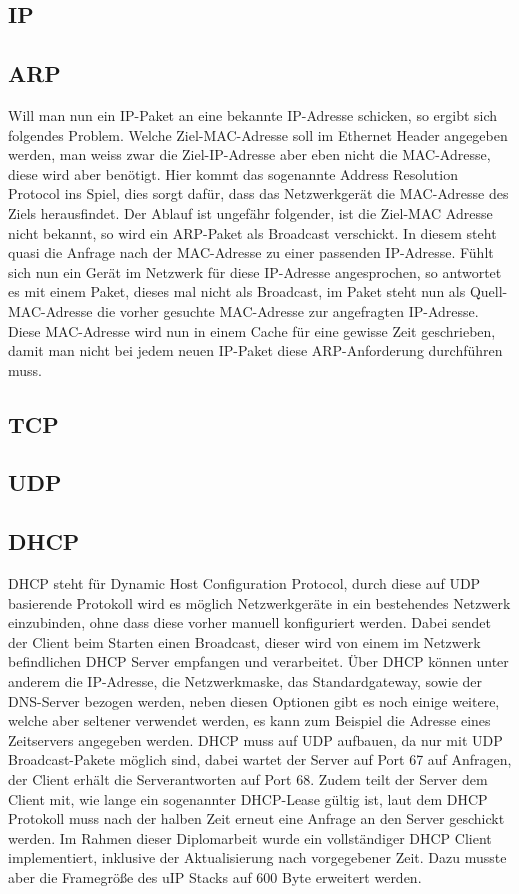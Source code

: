 \documentclass[a4paper,14pt,headsepline]{scrartcl}
\begin{document}
\subsection{IP}

\subsection{ARP}
Will man nun ein IP-Paket an eine bekannte IP-Adresse schicken, so ergibt sich folgendes Problem. Welche Ziel-MAC-Adresse soll im Ethernet Header angegeben werden, man weiss zwar die Ziel-IP-Adresse aber eben nicht die MAC-Adresse, diese wird aber benötigt. Hier kommt das sogenannte Address Resolution Protocol ins Spiel, dies sorgt dafür, dass das Netzwerkgerät die MAC-Adresse des Ziels herausfindet. Der Ablauf ist ungefähr folgender, ist die Ziel-MAC Adresse nicht bekannt, so wird ein ARP-Paket als Broadcast verschickt. In diesem steht quasi die Anfrage nach der MAC-Adresse zu einer passenden IP-Adresse. Fühlt sich nun ein Gerät im Netzwerk für diese IP-Adresse angesprochen, so antwortet es mit einem Paket, dieses mal nicht als Broadcast, im Paket steht nun als Quell-MAC-Adresse die vorher gesuchte MAC-Adresse zur angefragten IP-Adresse. Diese MAC-Adresse wird nun in einem Cache für eine gewisse Zeit geschrieben, damit man nicht bei jedem neuen IP-Paket diese ARP-Anforderung durchführen muss.

\subsection{TCP}

\subsection{UDP}

\subsection{DHCP}
DHCP steht für Dynamic Host Configuration Protocol, durch diese auf UDP basierende Protokoll wird es möglich Netzwerkgeräte in ein bestehendes Netzwerk einzubinden, ohne dass diese vorher manuell konfiguriert werden. Dabei sendet der Client beim Starten einen Broadcast, dieser wird von einem im Netzwerk befindlichen DHCP Server empfangen und verarbeitet. Über DHCP können unter anderem die IP-Adresse, die Netzwerkmaske, das Standardgateway, sowie der DNS-Server bezogen werden, neben diesen Optionen gibt es noch einige weitere, welche aber seltener verwendet werden, es kann zum Beispiel die Adresse eines Zeitservers angegeben werden. DHCP muss auf UDP aufbauen, da nur mit UDP Broadcast-Pakete möglich sind, dabei wartet der Server auf Port 67 auf Anfragen, der Client erhält die Serverantworten auf Port 68. Zudem teilt der Server dem Client mit, wie lange ein sogenannter DHCP-Lease gültig ist, laut dem DHCP Protokoll muss nach der halben Zeit erneut eine Anfrage an den Server geschickt werden. Im Rahmen dieser Diplomarbeit wurde ein vollständiger DHCP Client implementiert, inklusive der Aktualisierung nach vorgegebener Zeit. Dazu musste aber die Framegröße des uIP Stacks auf 600 Byte erweitert werden.
\end{document}
